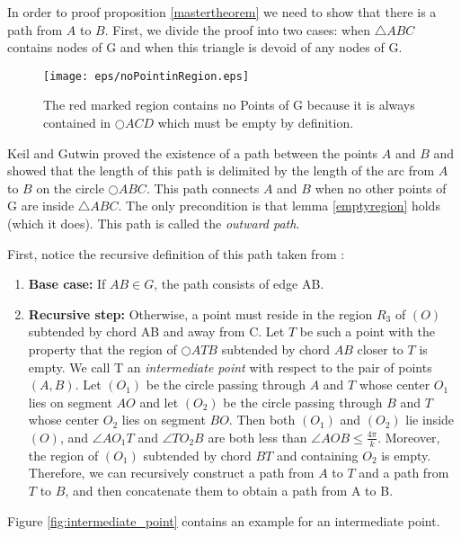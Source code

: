 In order to proof proposition \ref{mastertheorem} we need to show that there is a path from $A $ to $B $.
First, we divide the proof into two cases: when $\triangle{ABC} $ contains nodes of G and when this triangle is devoid of any nodes of G.
\begin{figure}[h!]
\centering
\texttt{[image: eps/noPointinRegion.eps]}
\caption{The red marked region contains no Points of G because it is always contained in $\bigcirc{ACD} $ which must be empty by definition.}
\label{fig:empty_region}
\end{figure}

Keil and Gutwin \cite{keil} proved the existence of a path between the points $A $ and $B $ and showed that the length of this path is delimited by the length of the arc from $A $ to $B $ on the circle $\bigcirc{ABC} $.
This path connects $A $ and $B $ when no other points of G are inside $\triangle{ABC} $.
The only precondition is that lemma \ref{emptyregion} holds (which it does).
This path is called the \emph{outward path}.
 
First, notice the recursive definition of this path taken from \cite{kanj}:
\begin{enumerate}
\item \textbf{Base case:} If $AB \in G $, the path consists of edge AB.
\item \textbf{Recursive step:} Otherwise, a point must reside in the region $R_3 $ of $(O) $ subtended by chord AB and away from C. 
Let $T $ be such a point with the property that the region of $\bigcirc{ATB} $ subtended by chord $AB $ closer to $T $ is empty. 
We call T an \emph{intermediate point} with respect to the pair of points $(A, B) $.
Let $(O_1) $ be the circle passing through $A $ and $T $ whose center $O_1 $ lies on segment $AO $  and let $(O_2) $ be the circle passing through $B $ and $T $ whose center $O_2 $ lies on segment $BO $.
Then both $(O_1) $ and $(O_2) $ lie inside $(O) $, and $\angle{AO_1T} $ and $\angle{TO_2B} $ are both less than $\angle{AOB} \leq \frac{4\pi}{k} $.
Moreover, the region of $(O_1) $ subtended by chord $BT $ and containing $O_2 $ is empty. Therefore, we can recursively construct a path from $A $ to $T $ and a path from $T $ to $B $, and then concatenate them to obtain a path from A to B.  
\end{enumerate}
Figure \ref{fig:intermediate_point} contains an example for an intermediate point.

